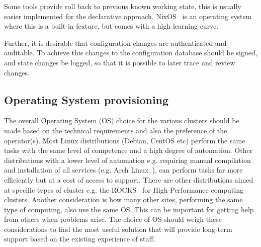 \documentclass[12pt,a4paper]{article}
\begin{document}
Some tools provide roll back to previous known working state, this is usually easier implemented for the declarative approach. 
NixOS~\cite{nixos} is an operating system where this is a built-in feature, but comes with a high learning curve. 

Further, it is desirable that configuration changes are authenticated and auditable. 
To achieve this changes to the configuration database should be signed, and state changes be logged, so that it is possible to later trace and review changes. 

\subsection{Operating System provisioning}
\label{ssec:os-prov}
The overall Operating System (OS) choice for the various clusters should be made based on the technical requirements and also the preference of the operator(s).
Most Linux distributions (Debian, CentOS etc) perform the same tasks with the same level of competence and a high degree of automation.
Other distributions with a lower level of automation e.g. requiring manual compilation and installation of all services (e.g. Arch Linux~\cite{archlinux}),
can perform tasks far more efficiently but at a cost of access to support.  
There are other distributions aimed at specific types of cluster e.g. the ROCKS~\cite{rocks} for High-Performance computing clusters.
Another consideration is how many other sites, performing the same type of computing, also use the same OS.
This can be important for getting help from others when problems arise.
The choice of OS should weigh these considerations to find the most useful solution that will provide long-term support based on the existing experience of staff.

\end{document}
